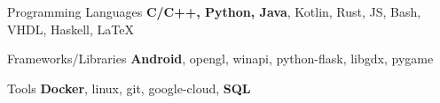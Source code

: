 

\begin{cvskills}

  \cvskill
    {Programming Languages} %
    {\textbf{C/C++, Python, Java}, Kotlin, Rust, JS, Bash, VHDL, Haskell, \LaTeX} %

  \cvskill
    {Frameworks/Libraries} %
    {\textbf{Android​}, opengl, winapi, python-flask, libgdx, pygame} %

  \cvskill
    {Tools} %
    {\textbf{​Docker​}, linux, git, google-cloud, \textbf{SQL}} %

\end{cvskills}
